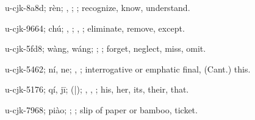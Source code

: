 \begin{multicols}{2}
{\cjkgGlue{}u-cjk-8a8d; rèn; \cjkgGlue{}\cjkgGlue{}\cjkgGlue{}, \cjkgGlue{}\cjkgGlue{}\cjkgGlue{}; \cjkgGlue{}; recognize, know, understand.

\cjkgGlue{}u-cjk-9664; chú; \cjkgGlue{}\cjkgGlue{}\cjkgGlue{}, \cjkgGlue{}\cjkgGlue{}\cjkgGlue{}; \cjkgGlue{}, \cjkgGlue{}; eliminate, remove, except.

\cjkgGlue{}u-cjk-5fd8; wàng, wáng; \cjkgGlue{}\cjkgGlue{}\cjkgGlue{}; \cjkgGlue{}; forget, neglect, miss, omit.

\cjkgGlue{}u-cjk-5462; ní, ne; \cjkgGlue{}, \cjkgGlue{}; interrogative or emphatic final, (Cant.) this.

\cjkgGlue{}u-cjk-5176; qí, jī; \cjkgGlue{}\cjkgGlue{}(\cjkgGlue{}|\cjkgGlue{}); \cjkgGlue{}, \cjkgGlue{}, \cjkgGlue{}; his, her, its, their, that.

\cjkgGlue{}u-cjk-7968; piào; \cjkgGlue{}; \cjkgGlue{}; slip of paper or bamboo, ticket.

}
\end{multicols}
